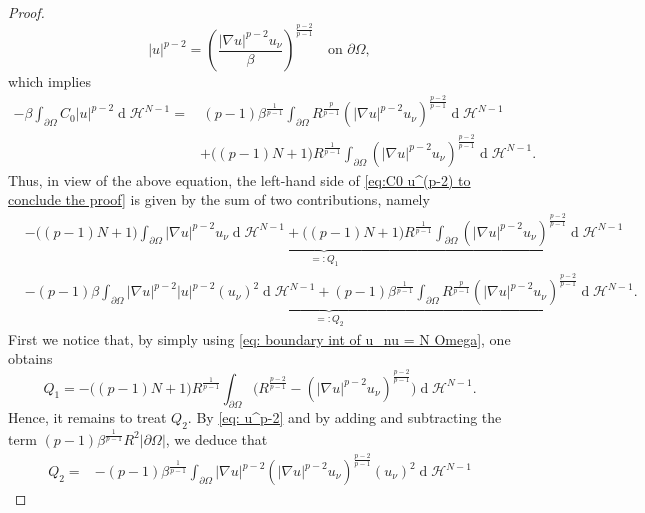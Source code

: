 \documentclass[10pt,a4paper]{amsart}
\numberwithin{equation}{section}
\renewcommand{\d}[1]{\ensuremath{\operatorname{d}\!{#1}}}
\begin{document}
\begin{proof}
\begin{equation}
        |u|^{p-2} = \left(\frac{|\nabla u|^{p-2} u_\nu}{\beta}\right)^\frac{p-2}{p-1} \quad \text{on }\partial\Omega,
    \end{equation}
    which implies 
    \begin{align*}
        -\beta \int_{\partial\Omega} C_0 |u|^{p-2} \d{}\mathcal{H}^{N-1} =& \,(p-1) \beta^{\frac{1}{p-1}} \int_{\partial\Omega} R^{\frac{p}{p-1}} (|\nabla u|^{p-2} u_\nu)^{\frac{p-2}{p-1}} \d{}\mathcal{H}^{N-1} 
        \\
        &+ \big( (p-1)N + 1 \big) R^{\frac{1}{p-1}} \int_{\partial\Omega}  (|\nabla u|^{p-2} u_\nu)^{\frac{p-2}{p-1}}  \d{}\mathcal{H}^{N-1}.
    \end{align*}        
    Thus, in view of the above equation, the left-hand side of \eqref{eq:C0 u^(p-2) to conclude the proof} is given by the sum of two contributions, namely
    \begin{equation}\label{eq:C0 u^(p-2) to conclude the proof 2}
    \begin{split}
    & \underbrace{- \big( (p-1)N + 1 \big)  \int_{\partial\Omega} |\nabla u|^{p-2} u_\nu \d{}\mathcal{H}^{N-1}
    + \big( (p-1)N + 1 \big) R^{\frac{1}{p-1}} \int_{\partial\Omega}  (|\nabla u|^{p-2} u_\nu)^{\frac{p-2}{p-1}}  \d{}\mathcal{H}^{N-1}}_{=:Q_1}
    \\
    & 
    \underbrace{- (p-1) \beta \int_{\partial\Omega} |\nabla u|^{p-2} |u|^{p-2} (u_\nu)^2 \d{}\mathcal{H}^{N-1} 
    + (p-1) \beta^{\frac{1}{p-1}} \int_{\partial\Omega} R^{\frac{p}{p-1}} (|\nabla u|^{p-2} u_\nu)^{\frac{p-2}{p-1}} \d{}\mathcal{H}^{N-1}}_{=:Q_2}.
    \end{split}
    \end{equation}
    First we notice that, by simply using \eqref{eq: boundary int of u_nu = N Omega}, one obtains 
    \begin{equation}\label{eq: Q1}
        Q_1 = - \big( (p-1)N + 1 \big) R^{\frac{1}{p-1}}  \int_{\partial\Omega} \Big( R^{\frac{p-2}{p-1}} - (|\nabla u|^{p-2} u_\nu)^{\frac{p-2}{p-1}} \Big)  \d{}\mathcal{H}^{N-1}.
    \end{equation}
    Hence, it remains to treat $Q_2$. By \eqref{eq: u^p-2} and by adding and subtracting the term $\displaystyle (p-1) \beta^{\frac{1}{p-1}}  R^2 |\partial\Omega|$, we deduce that 
    \begin{equation}\label{eq: Q_2 first}
    \begin{split}
    Q_2  =& - (p-1) \beta^{\frac{1}{p-1}} \int_{\partial\Omega} |\nabla u|^{p-2} (|\nabla u|^{p-2} u_\nu)^{\frac{p-2}{p-1}} (u_\nu)^2 \d{}\mathcal{H}^{N-1} 

\end{split}
\end{equation}
\end{proof}
\end{document}
